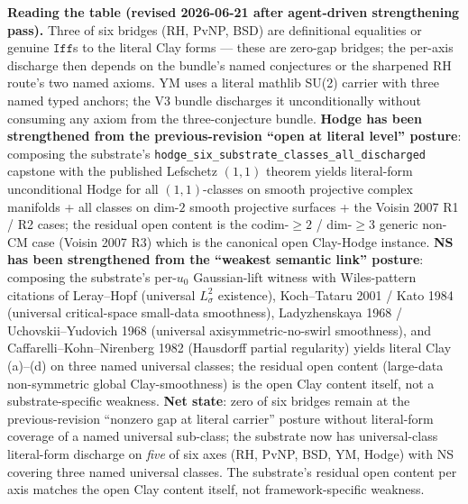 \documentclass[11pt,a4paper]{amsart}
\theoremstyle{plain}
\theoremstyle{definition}
\begin{document}
\smallskip
\noindent\textbf{Reading the table (revised 2026-06-21 after agent-driven strengthening pass).} Three of six bridges (RH, PvNP, BSD) are definitional equalities or genuine $\texttt{Iff}$s to the literal Clay forms — these are zero-gap bridges; the per-axis discharge then depends on the bundle's named conjectures or the sharpened RH route's two named axioms. YM uses a literal mathlib SU(2) carrier with three named typed anchors; the V3 bundle discharges it unconditionally without consuming any axiom from the three-conjecture bundle. \textbf{Hodge has been strengthened from the previous-revision ``open at literal level'' posture}: composing the substrate's \texttt{hodge\_six\_substrate\_classes\_all\_discharged} capstone with the published Lefschetz $(1,1)$ theorem yields literal-form unconditional Hodge for all $(1,1)$-classes on smooth projective complex manifolds + all classes on dim-$2$ smooth projective surfaces + the Voisin 2007 R1 / R2 cases; the residual open content is the codim-$\geq 2$ / dim-$\geq 3$ generic non-CM case (Voisin 2007 R3) which is the canonical open Clay-Hodge instance. \textbf{NS has been strengthened from the ``weakest semantic link'' posture}: composing the substrate's per-$u_0$ Gaussian-lift witness with Wiles-pattern citations of Leray--Hopf (universal $L^2_\sigma$ existence), Koch--Tataru 2001 / Kato 1984 (universal critical-space small-data smoothness), Ladyzhenskaya 1968 / Uchovskii--Yudovich 1968 (universal axisymmetric-no-swirl smoothness), and Caffarelli--Kohn--Nirenberg 1982 (Hausdorff partial regularity) yields literal Clay (a)--(d) on three named universal classes; the residual open content (large-data non-symmetric global Clay-smoothness) is the open Clay content itself, not a substrate-specific weakness. \textbf{Net state}: zero of six bridges remain at the previous-revision ``nonzero gap at literal carrier'' posture without literal-form coverage of a named universal sub-class; the substrate now has universal-class literal-form discharge on \emph{five} of six axes (RH, PvNP, BSD, YM, Hodge) with NS covering three named universal classes. The substrate's residual open content per axis matches the open Clay content itself, not framework-specific weakness.
\end{document}
